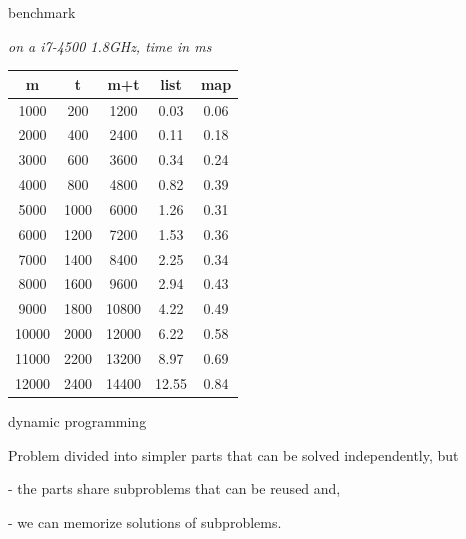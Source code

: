 \begin{frame}{benchmark}

  {\em on a i7-4500 1.8GHz, time in ms}
  \vspace{10pt}

\hspace{100pt}\begin{tabular}{|c|c|c|c|c|}
\hline 
       m & t & m+t & list & map\\
\hline
      1000&       200&      1200&      0.03&      0.06\\
      2000&       400&      2400&      0.11&      0.18\\
      3000&       600&      3600&      0.34&      0.24\\
      4000&       800&      4800&      0.82&      0.39\\
      5000&      1000&      6000&      1.26&      0.31\\
      6000&      1200&      7200&      1.53&      0.36\\
      7000&      1400&      8400&      2.25&      0.34\\
      8000&      1600&      9600&      2.94&      0.43\\
      9000&      1800&     10800&      4.22&      0.49\\
     10000&      2000&     12000&      6.22&      0.58\\
     11000&      2200&     13200&      8.97&      0.69\\
     12000&      2400&     14400&     12.55&      0.84\\
\hline
\end{tabular}


\end{frame}

\begin{frame}{dynamic programming}

\vspace{40pt}\hspace{80pt}\parbox[l][60pt][l]{240pt}{Problem divided into simpler parts that can be solved independently, but 

\vspace{10pt}\pause
-  the parts share subproblems that can be reused and,

\vspace{10pt}\pause
-  we can memorize solutions of subproblems.
}



\end{frame}


